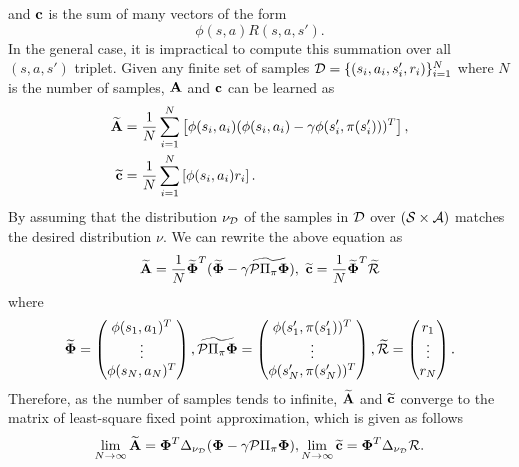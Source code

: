 and ${\mathbf c}$ is the sum of many vectors of the form
\begin{equation}
    \phi(s,a)R(s,a,s').
\end{equation}
In the general case, it is impractical to compute this summation over all $(s,a,s')$ triplet. Given any finite set of samples $\mathcal{D}=\{(s_i,a_i,s'_i,r_i)\}_{i=1}^N$ where $N$ is the number of samples, ${\mathbf A}$ and ${\mathbf c}$ can be learned as
\begin{align}
    \widetilde{{\mathbf A}} &= \frac{1}{N}\sum_{i=1}^N \left[\phi(s_i,a_i)(\phi(s_i,a_i)-\gamma\phi(s'_i,\pi(s'_i)))^T\right], \\
    \widetilde{{\mathbf c}} &= \frac{1}{N}\sum_{i=1}^N \left[\phi(s_i,a_i)r_i\right].
\end{align}
By assuming that the distribution $\nu_{\mathcal{D}}$ of the samples in $\mathcal{D}$ over $(\mathcal{S}\times\mathcal{A})$ matches the desired distribution $\nu$.
We can rewrite the above equation as
\begin{equation}
    \widetilde{{\mathbf A}} = \frac{1}{N}\widetilde{\boldsymbol{\Phi}}^T(\widetilde{\boldsymbol{\Phi}}-\gamma\widetilde{\mathcal{P}\Pi_{\pi}\boldsymbol{\Phi}}),~\widetilde{{\mathbf c}} = \frac{1}{N}\widetilde{\boldsymbol{\Phi}}^T\widetilde{\mathcal{R}}
\end{equation}
where
\begin{equation}
    \widetilde{\boldsymbol{\Phi}} =
    \begin{pmatrix}
        \phi(s_1,a_1)^T \\
        \vdots \\
        \phi(s_N,a_N)^T
    \end{pmatrix},
    \widetilde{\mathcal{P}\Pi_{\pi}\boldsymbol{\Phi}} =
    \begin{pmatrix}
        \phi(s'_1,\pi(s'_1))^T \\
        \vdots \\
        \phi(s'_N,\pi(s'_N))^T
    \end{pmatrix},
    \widetilde{\mathcal{R}} =
    \begin{pmatrix}
        r_1 \\
        \vdots \\
        r_N
    \end{pmatrix}.
\end{equation}
Therefore, as the number of samples tends to infinite, $\widetilde{{\mathbf A}}$ and $\widetilde{{\mathbf c}}$ converge to the matrix of least-square fixed point approximation, which is given as follows
\begin{equation}
    \lim_{N\rightarrow\infty}\widetilde{{\mathbf A}} = \boldsymbol{\Phi}^T\Delta_{\nu_{\mathcal{D}}}(\boldsymbol{\Phi}-\gamma\mathcal{P}\Pi_{\pi}\boldsymbol{\Phi}), \lim_{N\rightarrow\infty}\widetilde{{\mathbf c}} = \boldsymbol{\Phi}^T \Delta_{\nu_{\mathcal{D}}} \mathcal{R}.
\end{equation}

